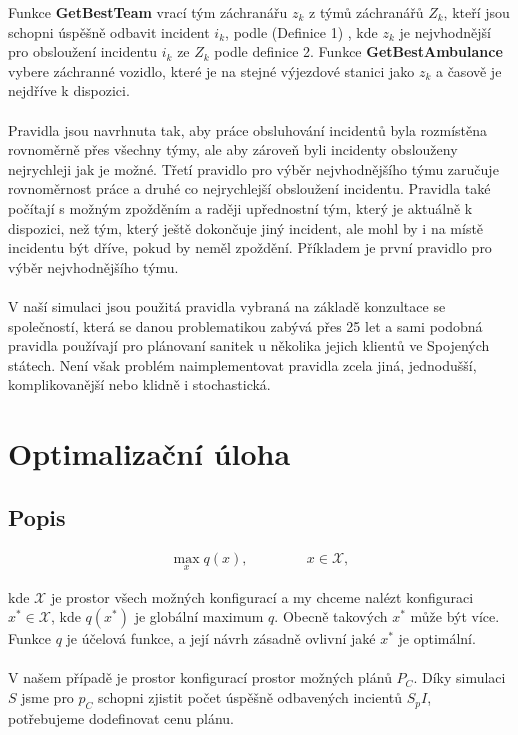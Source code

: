 Funkce \textbf{GetBestTeam} vrací tým záchranářu $z_k$ z týmů záchranářů $Z_k$, kteří jsou schopni úspěšně odbavit incident $i_k$, podle (Definice 1)
, kde $z_k$ je nejvhodnější pro obsloužení incidentu $i_k$ ze $Z_k$ podle definice 2. %
Funkce \textbf{GetBestAmbulance} vybere záchranné vozidlo, které je na stejné výjezdové stanici jako $z_k$ a časově je nejdříve k dispozici.
\\
\\
Pravidla jsou navrhnuta tak, aby práce obsluhování incidentů byla rozmístěna rovnoměrně přes všechny týmy, ale aby zároveň byli incidenty obslouženy nejrychleji jak je možné.
Třetí pravidlo pro výběr nejvhodnějšího týmu zaručuje rovnoměrnost práce a druhé co nejrychlejší obsloužení incidentu.
Pravidla také počítají s možným zpožděním a raději upřednostní tým, který je aktuálně k dispozici, než tým, který ještě dokončuje jiný incident, ale mohl by i na místě incidentu
být dříve, pokud by neměl zpoždění. Příkladem je první pravidlo pro výběr nejvhodnějšího týmu.
\\
\\
V naší simulaci jsou použitá pravidla vybraná na základě konzultace se společností, která se danou problematikou zabývá přes 25 let a sami podobná pravidla používají pro plánovaní sanitek
u několika jejich klientů ve Spojených státech.
Není však problém naimplementovat pravidla zcela jiná, jednodušší, komplikovanější nebo klidně i stochastická.

\section{Optimalizační úloha}

\subsection{Popis}

\begin{definice}
  \begin{align}
    \max_{x} q(x), \hspace{50pt} x \in \mathcal{X},
  \end{align}
\end{definice}

kde $\mathcal{X}$ je prostor všech možných konfigurací a my chceme nalézt konfiguraci $x^* \in \mathcal{X}$, kde $q(x^*)$ je globální maximum $q$.
Obecně takových $x^*$ může být více. 
Funkce $q$ je účelová funkce, a její návrh zásadně ovlivní jaké $x^*$ je optimální. 
\\
\\
V našem případě je prostor konfigurací prostor možných plánů $P_C$.
Díky simulaci $S$ jsme pro $p_C$ schopni zjistit počet úspěšně odbavených incientů $S_pI$, potřebujeme dodefinovat cenu plánu.

